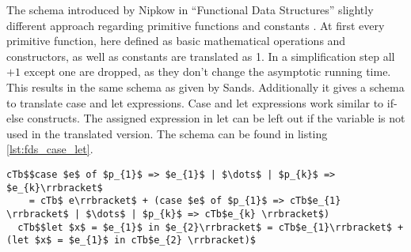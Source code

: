 The schema introduced by Nipkow in ``Functional Data Structures'' slightly different approach regarding primitive functions and constants \cite{fds}.
At first every primitive function, here defined as basic mathematical operations and constructors, as well as constants are translated as 1.
In a simplification step all $+ 1$ except one are dropped, as they don't change the asymptotic running time.
This results in the same schema as given by Sands.
Additionally it gives a schema to translate case and let expressions.
Case and let expressions work similar to if-else constructs.
The assigned expression in let can be left out if the variable is not used in the translated version.
The schema can be found in listing \ref{lst:fds_case_let}.
\begin{lstlisting}[language=translation,label=lst:fds_case_let,caption=Translation schema for case- and let-expression by Nipkow,mathescape=true]
  cTb$$case $e$ of $p_{1}$ => $e_{1}$ | $\dots$ | $p_{k}$ => $e_{k}\rrbracket$
    = cTb$ e\rrbracket$ + (case $e$ of $p_{1}$ => cTb$e_{1} \rrbracket$ | $\dots$ | $p_{k}$ => cTb$e_{k} \rrbracket$)
  cTb$$let $x$ = $e_{1}$ in $e_{2}\rrbracket$ = cTb$e_{1}\rrbracket$ + (let $x$ = $e_{1}$ in cTb$e_{2} \rrbracket)$
\end{lstlisting}
